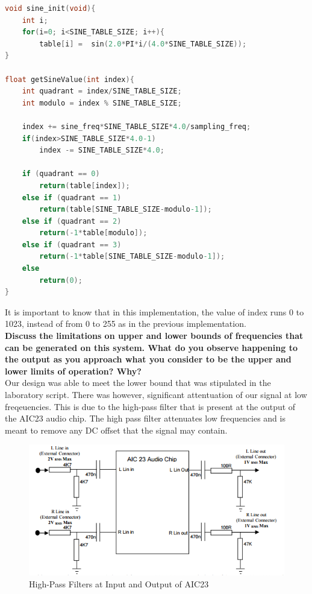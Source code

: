 \documentclass{article}
\begin{document}
\begin{lstlisting}[language=C, frame = single, caption=Functions that make use of Symmetry in Sine Wave to Increase Resolution of Output]
void sine_init(void){
	int i;
	for(i=0; i<SINE_TABLE_SIZE; i++){
		table[i] =  sin(2.0*PI*i/(4.0*SINE_TABLE_SIZE));
}

float getSineValue(int index){
    int quadrant = index/SINE_TABLE_SIZE;
    int modulo = index % SINE_TABLE_SIZE;
    
    index += sine_freq*SINE_TABLE_SIZE*4.0/sampling_freq;
    if(index>SINE_TABLE_SIZE*4.0-1)
        index -= SINE_TABLE_SIZE*4.0;
	    
    if (quadrant == 0)
        return(table[index]);
    else if (quadrant == 1)
        return(table[SINE_TABLE_SIZE-modulo-1]);
    else if (quadrant == 2)
        return(-1*table[modulo]);
    else if (quadrant == 3)
        return(-1*table[SINE_TABLE_SIZE-modulo-1]);	
    else
        return(0);
}
\end{lstlisting}
It is important to know that in this implementation, the value of index runs 0 to 1023, instead of from 0 to 255 as in the previous implementation.\\


\textbf{Discuss the limitations on upper and lower bounds of frequencies that can be generated on this system. What do you observe happening to the output as you approach what you consider to be the upper and lower limits of operation? Why?}\\



Our design was able to meet the lower bound that was stipulated in the laboratory script. There was however, significant attentuation of our signal at low freqeuencies. This is due to the high-pass filter that is present at the output of the AIC23 audio chip. The high pass filter attenuates low frequencies and is meant to remove any DC offset that the signal may contain.

\begin{figure}[h]
    \centering{}
    \includegraphics[scale=0.7]{AIC23.PNG}
    \caption{High-Pass Filters at Input and Output of AIC23}
\end{figure}
\end{document}

